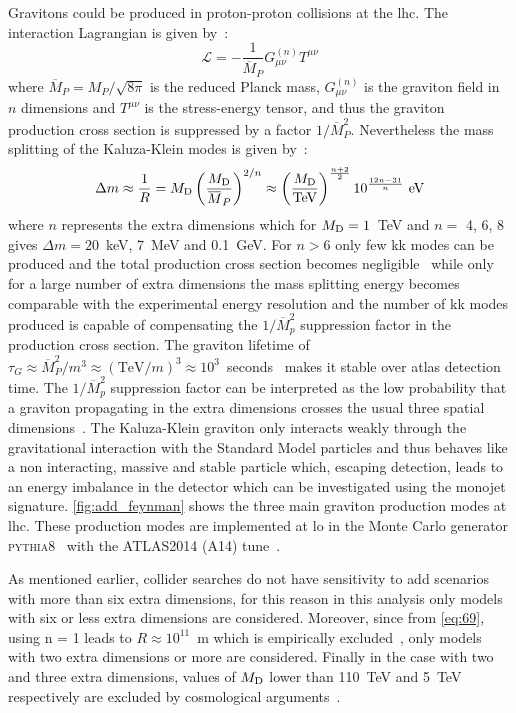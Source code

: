 Gravitons could be produced in proton-proton collisions at the \gls{lhc}. The
interaction Lagrangian is given by~\cite{ADDPhenomenology}:
\begin{equation}
  \label{eq:114}
  \mathcal{L} = - \frac{1}{\overbar{M}_P} G^{(n)}_{\mu\nu} T^{\mu\nu}
\end{equation}
where $\overbar{M}_P = M_P/\sqrt{8 \pi}$ is the reduced Planck mass,
$G^{(n)}_{\mu\nu}$ is the graviton field in $n$ dimensions and $T^{\mu\nu}$ is
the stress-energy tensor, and thus the graviton production cross section is
suppressed by a factor $1/\overbar{M}^2_P$. Nevertheless the mass splitting of
the Kaluza-Klein modes is given by~\cite{ADDPhenomenology}:
\begin{equation}
  \label{eq:115}
  \Delta m \approx \frac{1}{R} = \md \left( \frac{\md}{\overbar{M}_P}
  \right)^{2/n} \approx \left( \frac{\md}{\mathrm{TeV}} \right)^{\frac{n +
  2}{2}} 10^{\frac{12 n - 31}{n}}~\mathrm{eV}
\end{equation}
where $n$ represents the extra dimensions which for $M_\mathrm{D} = 1$~TeV and $n =$ 4,
6, 8 gives $\Delta m = 20$~keV, 7~MeV and 0.1~GeV. For $n > 6$ only few \gls{kk}
modes can be produced and the total production cross section becomes
negligible~\cite{ADDPhenomenology} while only for a large number of extra
dimensions the mass splitting energy becomes comparable with the experimental
energy resolution and the number of \gls{kk} modes produced is capable of
compensating the $1/\overbar{M}^2_p$ suppression factor in the production cross
section. The graviton lifetime of
$\tau_G \approx \overbar{M}^2_P/m^3 \approx (\mathrm{TeV}/m)^3 \approx
10^3$~seconds~\cite{ADDPhenomenology} makes it stable over \gls{atlas} detection
time. The $1/\overbar{M}^2_p$ suppression factor can be interpreted as the low
probability that a graviton propagating in the extra dimensions crosses the
usual three spatial dimensions~\cite{ADDPhenomenology}. The Kaluza-Klein
graviton only interacts weakly through the gravitational interaction with the
Standard Model particles and thus behaves like a non interacting, massive and
stable particle which, escaping detection, leads to an energy imbalance in the
detector which can be investigated using the monojet
signature. \cref{fig:add_feynman} shows the three main graviton production modes
at \gls{lhc}. These production modes are implemented at \gls{lo} in the Monte
Carlo generator \textsc{pythia8}~\cite{PYTHIA8} with the ATLAS2014 (A14)
tune~\cite{PYTHIATune}.

As mentioned earlier, collider searches do not have sensitivity to \gls{add}
scenarios with more than six extra dimensions, for this reason in this analysis
only models with six or less extra dimensions are considered. Moreover, since
from \cref{eq:69}, using n = 1 leads to $R \approx 10^{11}$~m which is
empirically excluded~\cite{ADDPhenomenology}, only models with two extra
dimensions or more are considered. Finally in the case with two and three extra
dimensions, values of $M_\mathrm{D}$ lower than 110~TeV and 5~TeV respectively are
excluded by cosmological arguments~\cite{ADDCosmology}.

